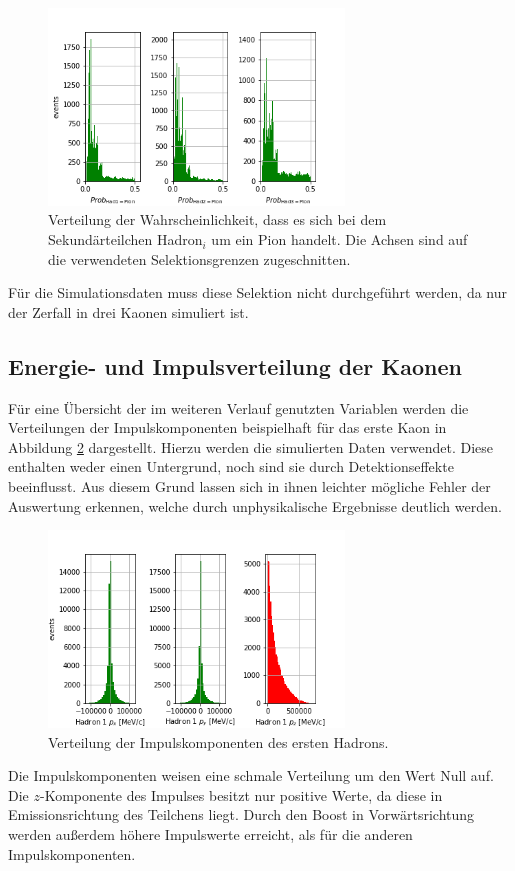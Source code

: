 \begin{figure}
  \centering
  \includegraphics[width=0.7\textwidth]{plots/sim_ProbPi_hist.png}
  \caption{Verteilung der Wahrscheinlichkeit, dass es sich bei dem Sekundärteilchen Hadron$_i$ um ein Pion handelt. Die Achsen sind auf die verwendeten Selektionsgrenzen zugeschnitten.}
  \label{fig:probPi}
\end{figure} 
\FloatBarrier
Für die Simulationsdaten muss diese Selektion nicht durchgeführt werden, da nur der Zerfall in drei Kaonen simuliert ist.

\subsection{Energie- und Impulsverteilung der Kaonen}
Für eine Übersicht der im weiteren Verlauf genutzten Variablen werden die Verteilungen der Impulskomponenten beispielhaft für das erste Kaon in Abbildung \ref{fig:Impuls1} dargestellt. Hierzu werden die simulierten Daten verwendet. Diese enthalten weder einen Untergrund, noch sind sie durch Detektionseffekte beeinflusst. Aus diesem Grund lassen sich in ihnen leichter mögliche Fehler der Auswertung erkennen, welche durch unphysikalische Ergebnisse deutlich werden.
\begin{figure}
  \centering
  \includegraphics[width=0.7\textwidth]{plots/sim_pall_hist}
  \caption{Verteilung der Impulskomponenten des ersten Hadrons.}
  \label{fig:Impuls1}
\end{figure} 
\FloatBarrier
Die Impulskomponenten weisen eine schmale Verteilung um den Wert Null auf. 
Die $z$-Komponente des Impulses besitzt nur positive Werte, da diese in Emissionsrichtung des Teilchens liegt. Durch den Boost in Vorwärtsrichtung werden außerdem höhere Impulswerte erreicht, als für die anderen Impulskomponenten.

